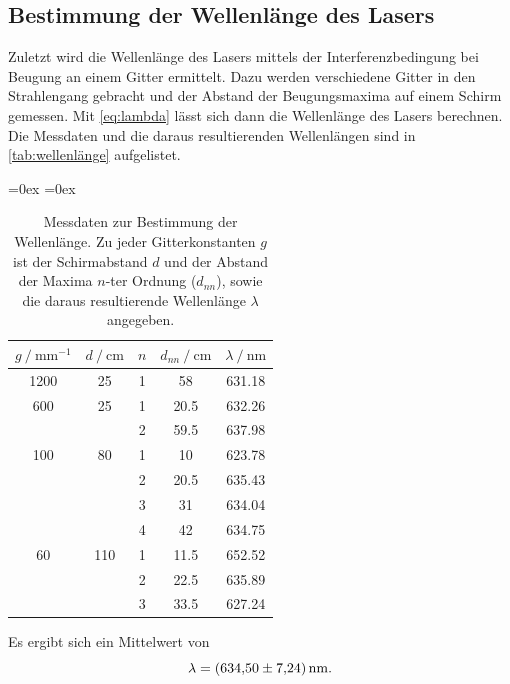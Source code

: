 \subsection{Bestimmung der Wellenlänge des Lasers}
Zuletzt wird die Wellenlänge des Lasers mittels der Interferenzbedingung bei Beugung an einem Gitter ermittelt. Dazu werden verschiedene Gitter in den Strahlengang gebracht und der 
Abstand der Beugungsmaxima auf einem Schirm gemessen. Mit \autoref{eq:lambda} lässt sich dann die Wellenlänge des Lasers berechnen.
Die Messdaten und die daraus resultierenden Wellenlängen sind in \autoref{tab:wellenlänge} aufgelistet.
\begin{table}
  \centering
  \aboverulesep=0ex %
  \belowrulesep=0ex %
  \caption{Messdaten zur Bestimmung der Wellenlänge. Zu jeder Gitterkonstanten $g$ ist der Schirmabstand $d$ und der Abstand der Maxima $n$-ter Ordnung ($d_{nn}$), 
  sowie die daraus resultierende Wellenlänge $\lambda$ angegeben.}
  \label{tab:wellenlänge}
  \begin{tabular}{S[table-format = 4.0] | S[table-format = 3.0] | S[table-format = 1.0] | S[table-format = 2.1] | S[table-format = 3.2]}
    {$g \mathbin{/} \unit{\milli\metre^{-1}}$} & {$d \mathbin{/} \unit{\centi\metre}$} & {$n$} & {$d_{nn} \mathbin{/} \unit{\centi\metre}$} & {$\lambda \mathbin{/} \unit{\nano\metre}$} \\
    \midrule
    \rule{0pt}{1.1EM}
    1200 & 25  & 1 &   58 & 631.18 \\
    \midrule
    \rule{0pt}{1.1EM}
     600 & 25  & 1 & 20.5 & 632.26 \\
         &     & 2 & 59.5 & 637.98 \\
    \midrule
    \rule{0pt}{1.1EM}
     100 & 80  & 1 &   10 & 623.78 \\
         &     & 2 & 20.5 & 635.43 \\
         &     & 3 &   31 & 634.04 \\
         &     & 4 &   42 & 634.75 \\
    \midrule
    \rule{0pt}{1.1EM}
      60 & 110 & 1 & 11.5 & 652.52 \\
         &     & 2 & 22.5 & 635.89 \\
         &     & 3 & 33.5 & 627.24 \\
  \end{tabular}
\end{table}
Es ergibt sich ein Mittelwert von 
\begin{equation*}
  \lambda = \qty{634.5 +- 7.24}{\nano\metre}.
\end{equation*}
